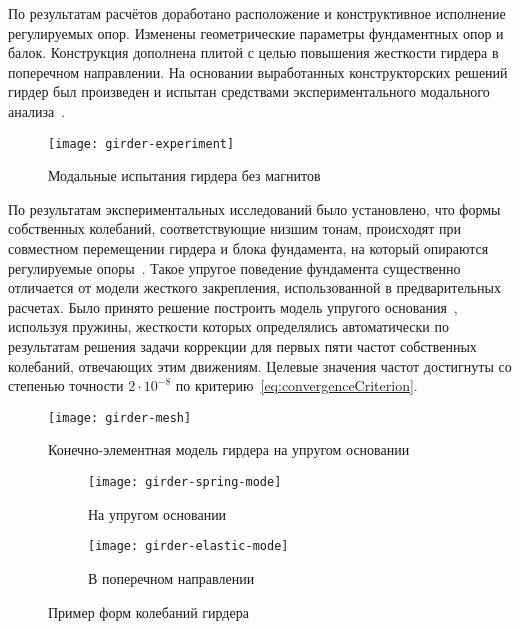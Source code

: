 По результатам расчётов доработано расположение и конструктивное исполнение регулируемых опор. Изменены геометрические параметры фундаментных опор и балок. Конструкция дополнена плитой с целью повышения жесткости гирдера в поперечном направлении. На основании выработанных конструкторских решений гирдер был произведен и испытан средствами экспериментального модального анализа~.

\begin{figure}[!htb]
	\centering
	\texttt{[image: girder-experiment]}
	\caption{Модальные испытания гирдера без магнитов} \label{fig:girder-experiment}
\end{figure}

По результатам экспериментальных исследований было установлено, что формы собственных колебаний, соответствующие низшим тонам, происходят при совместном перемещении гирдера и блока фундамента, на который опираются регулируемые опоры~. Такое упругое поведение фундамента существенно отличается от модели жесткого закрепления, использованной в предварительных расчетах. Было принято решение построить модель упругого основания~, используя пружины, жесткости которых определялись автоматически по результатам решения задачи коррекции для первых пяти частот собственных колебаний, отвечающих этим движениям. Целевые значения частот достигнуты со степенью точности $ 2 \cdot 10 ^ {-8} $ по критерию~\eqref{eq:convergenceCriterion}.

\begin{figure}[H]
	\centering
	\texttt{[image: girder-mesh]}
	\caption{Конечно-элементная модель гирдера на упругом основании} \label{fig:girder-mesh}
\end{figure}

\def\sfGirder{0.48\textwidth}

\begin{figure}[!htb]
	\centering
	\begin{subfigure}[t]{\sfGirder}
		\centering
		\texttt{[image: girder-spring-mode]}
		\caption{На упругом основании} \label{subfig:girder-spring-mode}
	\end{subfigure}
	\hfill
	\begin{subfigure}[t]{\sfGirder}
		\centering
		\texttt{[image: girder-elastic-mode]}
		\caption{В поперечном направлении} \label{subfig:girder-elastic-mode}
	\end{subfigure}	
	\caption{Пример форм колебаний гирдера} 
\end{figure}

